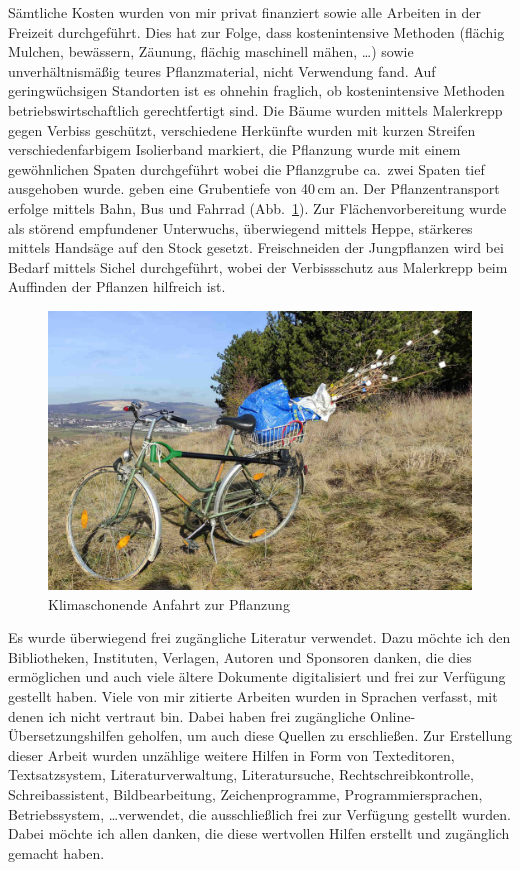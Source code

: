\documentclass[twocolumn]{scrartcl}
\begin{document}
Sämtliche Kosten wurden von mir privat finanziert sowie alle Arbeiten
in der Freizeit durchgeführt. Dies hat zur Folge, dass kostenintensive
Methoden (flächig Mulchen, bewässern, Zäunung, flächig maschinell
mähen, \dots) sowie unverhältnismäßig teures Pflanzmaterial, nicht
Verwendung fand. Auf geringwüchsigen Standorten ist es ohnehin
fraglich, ob kostenintensive Methoden betriebswirtschaftlich
gerechtfertigt sind. Die Bäume wurden mittels Malerkrepp gegen Verbiss
geschützt, verschiedene Herkünfte wurden mit kurzen Streifen
verschiedenfarbigem Isolierband markiert, die Pflanzung wurde mit
einem gewöhnlichen Spaten durchgeführt wobei die Pflanzgrube ca.\ zwei
Spaten tief ausgehoben wurde. \citet{ciuvat2022robinieRumaenien} geben
eine Grubentiefe von 40\,cm an. Der Pflanzentransport
erfolge mittels Bahn, Bus und Fahrrad
(Abb.~\ref{fig:fahrradPflanzung}). Zur Flächenvorbereitung wurde als
störend empfundener Unterwuchs, überwiegend mittels Heppe, stärkeres
mittels Handsäge auf den Stock gesetzt. Freischneiden der Jungpflanzen
wird bei Bedarf mittels Sichel durchgeführt, wobei der Verbissschutz
aus Malerkrepp beim Auffinden der Pflanzen hilfreich ist.

\begin{figure}[htbp]
  \centering
  \includegraphics[width=.9\linewidth]{./bild/fahrradPflanzung}
  \caption{Klimaschonende Anfahrt zur Pflanzung}
  \label{fig:fahrradPflanzung}
\end{figure}

Es wurde überwiegend frei zugängliche Literatur verwendet. Dazu möchte ich den
Bibliotheken, Instituten, Verlagen, Autoren und Sponsoren danken, die dies
ermöglichen und auch viele ältere Dokumente digitalisiert und frei zur Verfügung
gestellt haben. Viele von mir zitierte Arbeiten wurden in Sprachen verfasst, mit
denen ich nicht vertraut bin. Dabei haben frei zugängliche
Online-Übersetzungshilfen geholfen, um auch diese Quellen zu erschließen. Zur
Erstellung dieser Arbeit wurden unzählige weitere Hilfen in Form von
Texteditoren, Textsatzsystem, Literaturverwaltung, Literatursuche,
Rechtschreibkontrolle, Schreibassistent, Bildbearbeitung, Zeichenprogramme,
Programmiersprachen, Betriebssystem, \dots verwendet, die ausschließlich frei
zur Verfügung gestellt wurden. Dabei möchte ich allen danken, die diese
wertvollen Hilfen erstellt und zugänglich gemacht haben.
\end{document}
